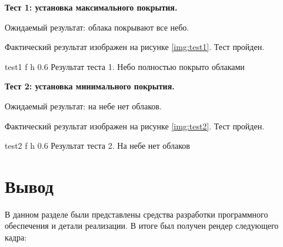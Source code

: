 \textbf{Тест 1: установка максимального покрытия.}

Ожидаемый результат: облака покрывают все небо.

Фактический результат изображен на рисунке \ref{img:test1}. Тест пройден.

{test1} %
{f} %
{h} %
{0.6\textwidth} %
{Результат теста 1. Небо полностью покрыто облаками} %


\textbf{Тест 2: установка минимального покрытия.}

Ожидаемый результат: на небе нет облаков.

Фактический результат изображен на рисунке \ref{img:test2}. Тест пройден.

{test2} %
{f} %
{h} %
{0.6\textwidth} %
{Результат теста 2. На небе нет облаков} %





\clearpage
\section{Вывод}

В данном разделе были представлены средства разработки программного обеспечения и детали реализации. В итоге был получен рендер следующего кадра:


